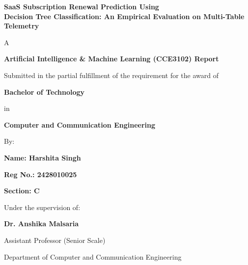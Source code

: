 \documentclass[pdflatex,sn-mathphys-num]{sn-jnl}
\begin{document}
\thispagestyle{empty}
\begin{center}
    \vspace*{0.4cm}
    {\fontsize{14.5pt}{19pt}\selectfont \textbf{SaaS Subscription Renewal Prediction Using\\[3pt]
    Decision Tree Classification: An Empirical Evaluation on Multi-Table Telemetry}\par}

    \vspace{1.0cm}
    {\fontsize{11pt}{15pt}\selectfont A\par}

    \vspace{0.8cm}
    {\fontsize{11pt}{15pt}\selectfont \textbf{Artificial Intelligence \& Machine Learning (CCE3102) Report}\par}

    \vspace{1.0cm}
    {\fontsize{11pt}{15pt}\selectfont Submitted in the partial fulfillment of the requirement for the award of\par}

    \vspace{0.6cm}
    {\fontsize{11pt}{15pt}\selectfont \textbf{Bachelor of Technology}\par}
    \vspace{0.3cm}
    {\fontsize{11pt}{15pt}\selectfont in\par}
    \vspace{0.3cm}
    {\fontsize{11pt}{15pt}\selectfont \textbf{Computer and Communication Engineering}\par}

    \vspace{1.2cm}
    {\fontsize{11pt}{15pt}\selectfont By:\par}
    \vspace{0.4cm}
    {\fontsize{11pt}{15pt}\selectfont \textbf{Name: Harshita Singh}\par}
    \vspace{0.2cm}
    {\fontsize{11pt}{15pt}\selectfont \textbf{Reg No.: 2428010025}\par}
    \vspace{0.2cm}
    {\fontsize{11pt}{15pt}\selectfont \textbf{Section: C}\par}

    \vspace{1.2cm}
    {\fontsize{11pt}{15pt}\selectfont Under the supervision of:\par}
    \vspace{0.4cm}
    {\fontsize{11pt}{15pt}\selectfont \textbf{Dr. Anshika Malsaria}\par}
    \vspace{0.2cm}
    {\fontsize{10pt}{13pt}\selectfont Assistant Professor (Senior Scale)\par}
    \vspace{0.1cm}
    {\fontsize{10pt}{13pt}\selectfont Department of Computer and Communication Engineering\par}


\end{center}
\end{document}
